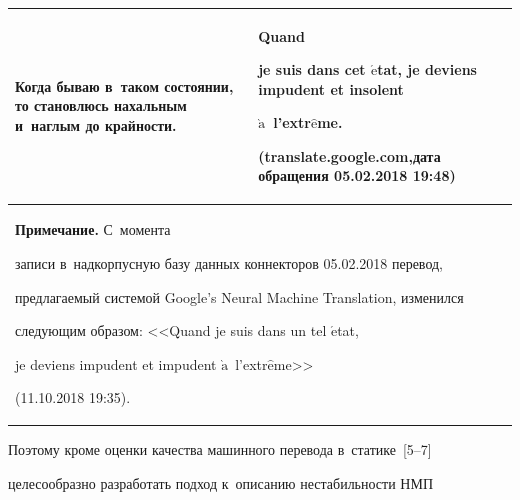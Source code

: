 \begin{table}[b]\small %


\vspace*{-12pt}


\begin{center}




\vspace*{2ex}





\tabcolsep=5pt


\begin{tabular}{|p{150pt}|p{200pt}|}


\hline


Когда бываю в~таком состоянии, то становлюсь нахальным и~наглым до крайности.&Quand 


je suis dans cet $\acute{\mbox{e}}$tat, je deviens impudent et insolent 


$\grave{\mbox{a}}$~l'extr$\hat{\mbox{e}}$me.\newline


(translate.google.com,\newline дата обращения 05.02.2018 19:48)\\


\hline


\multicolumn{2}{p{361pt}}{\footnotesize \textbf{Примечание.} С~момента 


записи в~надкорпусную базу данных коннекторов 05.02.2018 перевод, 


предлагаемый системой Google's Neural Machine Translation, изменился 


следующим образом: <<Quand je suis dans un tel $\acute{\mbox{e}}$tat, 


je deviens impudent et impudent $\grave{\mbox{a}}$~l'extr$\hat{\mbox{e}}$me>> 


(11.10.2018 19:35). }


\end{tabular}


\end{center}


\end{table}


  


  Поэтому кроме оценки качества машинного перевода в~статике~[5--7] 


целесообразно разработать подход к~описанию нестабильности НМП 


